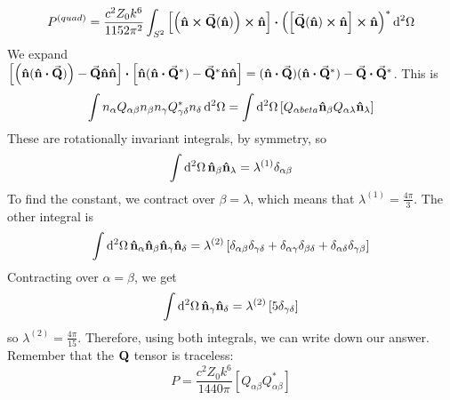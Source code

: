 \documentclass[a4paper,twoside,master.tex]{subfiles}
\begin{document}
\begin{equation}
    P^{(quad)} = \frac{c^2 Z_0 k^6}{1152 \pi^2} \int_{S^2} \left[ \left( \vu{n} \cross \va{Q}( \vu{n}) \right) \cross \vu{n} \right] \vdot \left( \left[ \va{Q}( \vu{n}) \cross \vu{n} \right] \cross \vu{n} \right)^* \dd[2]{\Omega}
\end{equation}
We expand $ \left[ \left( \vu{n} ( \vu{n} \vdot \va{Q}) \right) - \va{Q} \vu{n} \vu{n} \right] \vdot \left[ \vu{n} (\vu{n} \vdot \va{Q}^*) - \va{Q}^* \vu{n} \vu{n} \right] = ( \vu{n} \vdot \va{Q}) ( \vu{n} \vdot \va{Q}^*)- \va{Q} \vdot \va{Q}^* $.
This is
\begin{equation}
    \int n_{\alpha} Q_{\alpha \beta} n_{\beta} n_{\gamma} Q^*_{\gamma \delta} n_{\delta} \dd[2]{\Omega} = \int \dd[2]{\Omega} \left[ Q_{\alpha bet a} \vu{n}_{\beta} Q_{\alpha \lambda} \vu{n}_{\lambda} \right]
\end{equation}
These are rotationally invariant integrals, by symmetry, so
\begin{equation}
    \int \dd[2]{\Omega} \vu{n}_{\beta} \vu{n}_{\lambda} = \lambda^{(1)} \delta_{\alpha \beta}
\end{equation}
To find the constant, we contract over $ \beta = \lambda $, which means that $ \lambda^{(1)} = \frac{4 \pi}{3} $. The other integral is
\begin{equation}
    \int \dd[2]{\Omega} \vu{n}_{\alpha} \vu{n}_{\beta} \vu{n}_{\gamma} \vu{n}_{\delta} = \lambda^{(2)} \left[ \delta_{\alpha \beta} \delta_{\gamma \delta} + \delta_{\alpha \gamma} \delta_{\beta \delta} + \delta_{\alpha \delta} \delta_{\gamma \beta} \right]
\end{equation}
Contracting over $ \alpha = \beta $, we get
\begin{equation}
    \int \dd[2]{\Omega} \vu{n}_{\gamma} \vu{n}_{\delta} = \lambda^{(2)} \left[ 5 \delta_{\gamma \delta} \right]
\end{equation}
so $ \lambda^{(2)} = \frac{4 \pi}{15} $. Therefore, using both integrals, we can write down our answer. Remember that the $ \vb{Q} $ tensor is traceless:
\begin{equation}
    P = \frac{c^2 Z_0 k^6}{1440 \pi} \left[ Q_{\alpha \beta} Q^*_{\alpha \beta} \right]
\end{equation}
\end{document}
